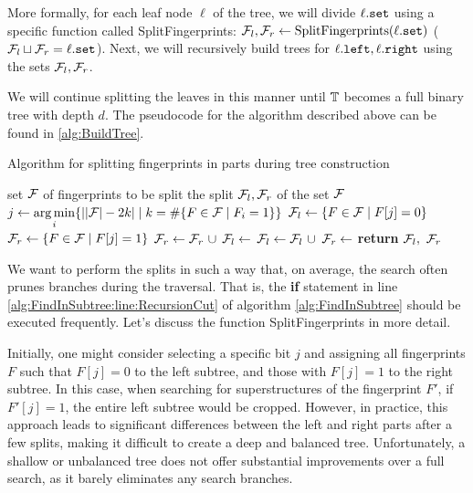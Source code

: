 More formally, for each leaf node $\ell$ of the tree, we will divide $\ell.{\tt set}$ using a specific function called SplitFingerprints: $\mathcal{F}_l, \mathcal{F}_r \gets \text{SplitFingerprints}(\ell.{\tt set})$ ($\mathcal{F}_l \sqcup \mathcal{F}_r = \ell.{\tt set}$).
Next, we will recursively build trees for $\ell.{\tt left}, \ell.{\tt right}$ using the sets $\mathcal{F}_l, \mathcal{F}_r$.

We will continue splitting the leaves in this manner until $\mathbb{T}$ becomes a full binary tree with depth $d$. The pseudocode for the algorithm described above can be found in \ref{alg:BuildTree}.
 

\begin{algorithm}
  \caption{Algorithm for splitting fingerprints in parts during tree construction} \label{alg:SplitFingerprints}
  \begin{algorithmic}[1]
    \Require set $\mathcal{F}$ of fingerprints to be split
    \Ensure the split $\mathcal{F}_l, \mathcal{F}_r$ of the set $\mathcal{F}$
      \State $j \gets \operatorname*{arg\,min}\limits_{i}\{ \left| |\mathcal{F}| - 2k \right| \mid k = \# \{F \in \mathcal{F} \mid F_i = 1 \} \}$ %
      \State $\mathcal{F}_l \gets \{F \in \mathcal{F} \mid F[j] = 0\}$
      \State $\mathcal{F}_r \gets \{F \in \mathcal{F} \mid F[j] = 1\}$ 
	\State $\F_r \gets \F_r \ \cup$ 
	\State $\mathcal{F}_l \gets $  
	\State $\mathcal{F}_l \gets \mathcal{F}_l \ \cup$ 
	\State $\mathcal{F}_r \gets $  
      \EndIf
      \State \textbf{return} $\mathcal{F}_l, \ \mathcal{F}_r$ 
    \EndProcedure
  \end{algorithmic}
\end{algorithm}

We want to perform the splits in such a way that, on average, the search often prunes branches during the traversal. That is, the {\bf if} statement in line \ref{alg:FindInSubtree:line:RecursionCut} of algorithm \ref{alg:FindInSubtree} should be executed frequently. Let's discuss the function SplitFingerprints in more detail.

Initially, one might consider selecting a specific bit $j$ and assigning all fingerprints $F$ such that $F[j] = 0$ to the left subtree, and those with $F[j] = 1$ to the right subtree. In this case, when searching for superstructures of the fingerprint $F'$, if $F'[j] = 1$, the entire left subtree would be cropped. However, in practice, this approach leads to significant differences between the left and right parts after a few splits, making it difficult to create a deep and balanced tree. Unfortunately, a shallow or unbalanced tree does not offer substantial improvements over a full search, as it barely eliminates any search branches.

